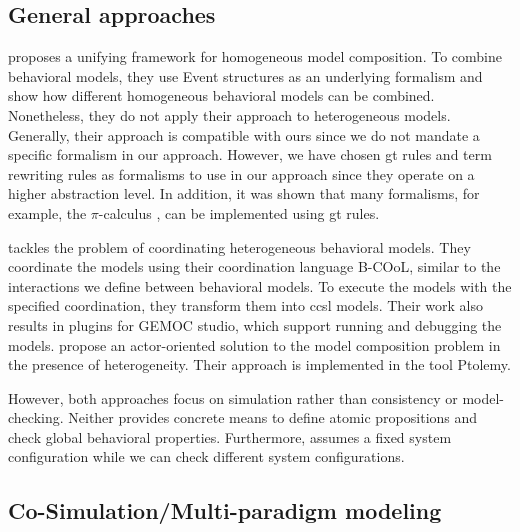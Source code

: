 \documentclass{jot}
\begin{document}
\subsection{General approaches}
\cite{kienzleUnifyingFrameworkHomogeneous2019} proposes a unifying framework for homogeneous model composition.
To combine behavioral models, they use Event structures as an underlying formalism and show how different homogeneous behavioral models can be combined.
Nonetheless, they do not apply their approach to heterogeneous models.
Generally, their approach is compatible with ours since we do not mandate a specific formalism in our approach.
However, we have chosen \gls*{gt} rules and term rewriting rules as formalisms to use in our approach since they operate on a higher abstraction level.
In addition, it was shown that many formalisms, for example, the $\pi$-calculus \cite{gadducciGraphRewritingPcalculus2007}, can be implemented using \gls*{gt} rules.

\cite{varalarsenBehavioralCoordinationOperator2015} tackles the problem of coordinating heterogeneous behavioral models.
They coordinate the models using their coordination language B-COoL, similar to the interactions we define between behavioral models.
To execute the models with the specified coordination, they transform them into \gls*{ccsl} models.  
Their work also results in plugins for GEMOC studio, which support running and debugging the models.
\cite{ekerTamingHeterogeneityPtolemy2003} propose an actor-oriented solution to the model composition problem in the presence of heterogeneity.
Their approach is implemented in the tool Ptolemy.

However, both approaches focus on simulation rather than consistency or model-checking.
Neither provides concrete means to define atomic propositions and check global behavioral properties.
Furthermore, \cite{varalarsenBehavioralCoordinationOperator2015} assumes a fixed system configuration while we can check different system configurations.

\subsection{Co-Simulation/Multi-paradigm modeling}

\end{document}
